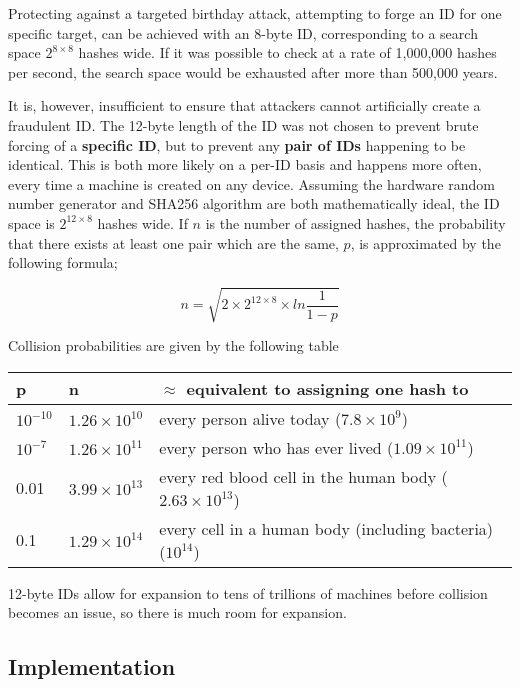 \documentclass{article}
\begin{document}
Protecting against a targeted birthday attack, attempting to forge an ID for one specific target, can be achieved with an 8-byte ID, corresponding to a search space \( 2^{8 \times 8} \) hashes wide. If it was possible to check at a rate of 1,000,000 hashes per second, the search space would be exhausted after more than 500,000 years.

It is, however, insufficient to ensure that attackers cannot artificially create a fraudulent ID. The 12-byte length of the ID was not chosen to prevent brute forcing of a \textbf{specific ID}, but to prevent any \textbf{pair of IDs} happening to be identical. This is both more likely on a per-ID basis and happens more often, every time a machine is created on any device. Assuming the hardware random number generator and SHA256 algorithm are both mathematically ideal, the ID space is \( 2^{12 \times 8} \) hashes wide. If \( n \) is the number of assigned hashes, the probability that there exists at least one pair which are the same, \( p \), is approximated by the following formula\cite{birth};

\[ n = \sqrt{2 \times 2^{12 \times 8} \times ln\frac{1}{1-p}}\]

Collision probabilities are given by the following table
\begin{table}[h]
\begin{tabular}{l|l|l}
p				&n							&\( \approx \) equivalent to assigning one hash to \\ \hline
\( 10^{-10}\)	&\( 1.26 \times 10^{10}\)	& every person alive today (\( 7.8 \times 10^{9}\))\\
\( 10^{-7}\)	&\( 1.26 \times 10^{11}\)	& every person who has ever lived (\( 1.09 \times 10^{11}\)) \\
0.01			&\( 3.99 \times 10^{13}\)	& every red blood cell in the human body (\( 2.63 \times 10^{13}\)) \\
0.1				&\( 1.29 \times 10^{14}\)	& every cell in a human body (including bacteria) (\( 10^{14}\))

\end{tabular}
\end{table}
\pagebreak

12-byte IDs allow for expansion to tens of trillions of machines before collision becomes an issue, so there is much room for expansion.

\subsection{Implementation}
\end{document}

